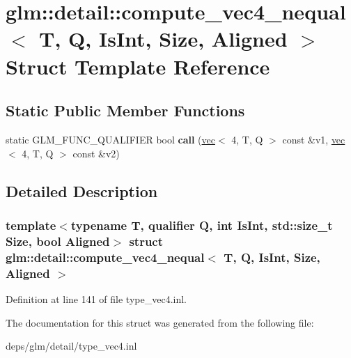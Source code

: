 \hypertarget{structglm_1_1detail_1_1compute__vec4__nequal}{}\section{glm\+:\+:detail\+:\+:compute\+\_\+vec4\+\_\+nequal$<$ T, Q, Is\+Int, Size, Aligned $>$ Struct Template Reference}
\label{structglm_1_1detail_1_1compute__vec4__nequal}
\subsection*{Static Public Member Functions}
\begin{DoxyCompactItemize}
\item 
\mbox{\label{structglm_1_1detail_1_1compute__vec4__nequal_a3f11c3a7f2b2349d938936b8a68e26b4}} 
static G\+L\+M\+\_\+\+F\+U\+N\+C\+\_\+\+Q\+U\+A\+L\+I\+F\+I\+ER bool {\bfseries call} (\hyperlink{structglm_1_1vec}{vec}$<$ 4, T, Q $>$ const \&v1, \hyperlink{structglm_1_1vec}{vec}$<$ 4, T, Q $>$ const \&v2)
\end{DoxyCompactItemize}


\subsection{Detailed Description}
\subsubsection*{template$<$typename T, qualifier Q, int Is\+Int, std\+::size\+\_\+t Size, bool Aligned$>$\newline
struct glm\+::detail\+::compute\+\_\+vec4\+\_\+nequal$<$ T, Q, Is\+Int, Size, Aligned $>$}



Definition at line 141 of file type\+\_\+vec4.\+inl.



The documentation for this struct was generated from the following file\+:\begin{DoxyCompactItemize}
\item 
deps/glm/detail/type\+\_\+vec4.\+inl\end{DoxyCompactItemize}
